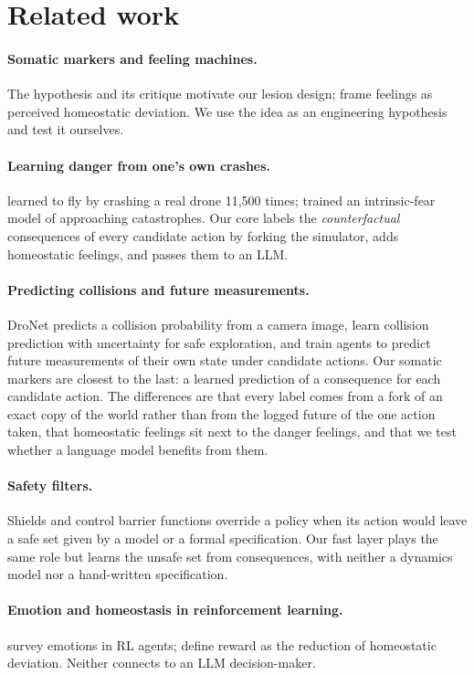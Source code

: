 \documentclass[10pt]{article}
\begin{document}
\section{Related work}
\paragraph{Somatic markers and feeling machines.} The hypothesis \citep{damasio1994,bechara1997} and its critique \citep{dunn2006}
motivate our lesion design; \citet{man2019} frame feelings as perceived homeostatic deviation. We use the idea as an engineering
hypothesis and test it ourselves.
\paragraph{Learning danger from one's own crashes.} \citet{gandhi2017} learned to fly by crashing a real drone 11,500 times;
\citet{lipton2016} trained an intrinsic-fear model of approaching catastrophes. Our core labels the \emph{counterfactual}
consequences of every candidate action by forking the simulator, adds homeostatic feelings, and passes them to an LLM.
\paragraph{Predicting collisions and future measurements.} DroNet \citep{loquercio2018dronet} predicts a collision probability from
a camera image, \citet{kahn2017uncertainty} learn collision prediction with uncertainty for safe exploration, and
\citet{dosovitskiy2017future} train agents to predict future measurements of their own state under candidate actions. Our somatic
markers are closest to the last: a learned prediction of a consequence for each candidate action. The differences are that every
label comes from a fork of an exact copy of the world rather than from the logged future of the one action taken, that homeostatic
feelings sit next to the danger feelings, and that we test whether a language model benefits from them.
\paragraph{Safety filters.} Shields \citep{alshiekh2018shield} and control barrier functions \citep{ames2019cbf} override a policy
when its action would leave a safe set given by a model or a formal specification. Our fast layer plays the same role but learns
the unsafe set from consequences, with neither a dynamics model nor a hand-written specification.
\paragraph{Emotion and homeostasis in reinforcement learning.} \citet{moerland2018} survey emotions in RL agents;
\citet{keramati2014} define reward as the reduction of homeostatic deviation. Neither connects to an LLM decision-maker.
\end{document}
